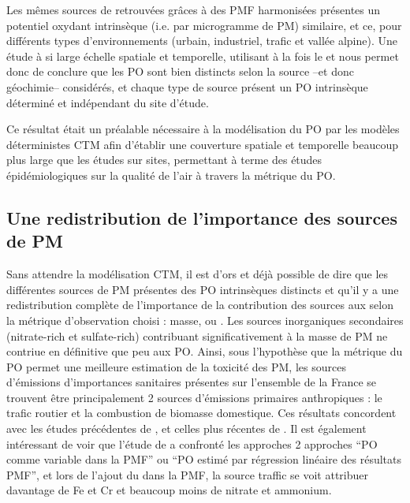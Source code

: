 Les mêmes sources de \PMdix{} retrouvées grâces à des PMF harmonisées présentes un potentiel
oxydant intrinsèque (i.e. par microgramme de PM) similaire, et ce, pour différents types
d'environnements (urbain, industriel, trafic et vallée alpine). Une étude à si large
échelle spatiale et temporelle, utilisant à la fois le \POAA{} et \PODTT{} nous permet
donc de conclure que les PO sont bien distincts selon la source --et donc géochimie--
considérés, et chaque type de source présent un PO intrinsèque déterminé et indépendant du
site d'étude.

Ce résultat était un préalable nécessaire à la modélisation du PO par les modèles
déterministes CTM afin d'établir une couverture spatiale et temporelle beaucoup plus
large que les études sur sites, permettant à terme des études épidémiologiques sur la
qualité de l'air à travers la métrique du PO.

\subsection{Une redistribution de l'importance des sources de PM}%
\label{sub:une_redistribution_de_l_importance_des_sources_de_pm}

Sans attendre la modélisation CTM, il est d'ors et déjà possible de dire que les
différentes sources de PM présentes des PO intrinsèques distincts et qu'il y a une
redistribution complète de l'importance de la contribution des sources aux \PMdix{} selon
la métrique d'observation choisi : masse, \POAAv{} ou \PODTTv. Les sources inorganiques
secondaires (nitrate-rich et sulfate-rich) contribuant significativement à la masse de PM
ne contriue en définitive que peu aux PO. Ainsi, sous l'hypothèse que
la métrique du PO permet une meilleure estimation de la toxicité des PM, les sources
d'émissions d'importances sanitaires présentes sur l'ensemble de la France se trouvent être
principalement 2 sources d'émissions primaires anthropiques : le trafic routier et la
combustion de biomasse domestique. Ces résultats concordent avec les études précédentes de
\cite{batesReactive2015,fangOxidative2016}, et celles plus récentes de
\cite{paraskevopoulouYearlong2019,cesariSource2019}. Il est également intéressant de
voir que l'étude de \cite{cesariSource2019} a confronté les approches 2 approches ``PO comme variable
dans la PMF'' ou ``PO estimé par régression linéaire des résultats PMF'', et lors
de l'ajout du \PODTTv{} dans la PMF, la source traffic se voit attribuer davantage de Fe
et Cr et beaucoup moins de nitrate et ammonium.

